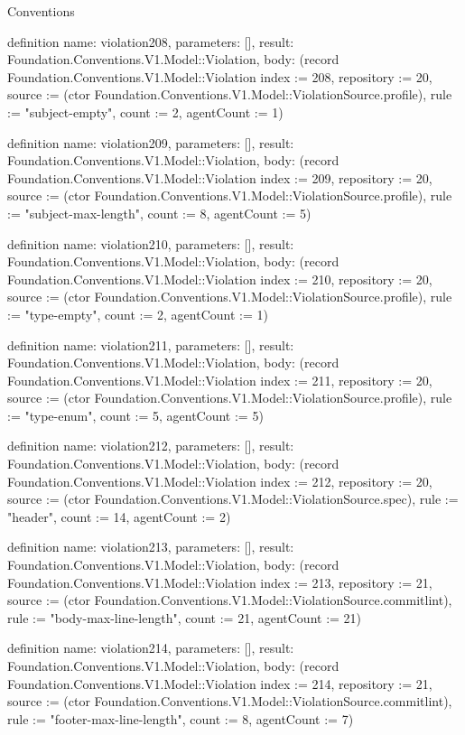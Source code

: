 \begin{lexlean}{Conventions}
\begin{semanticmodule}
definition{
  name: violation208,
  parameters: [],
  result: Foundation.Conventions.V1.Model::Violation,
  body: (record Foundation.Conventions.V1.Model::Violation {index := 208, repository := 20, source := (ctor Foundation.Conventions.V1.Model::ViolationSource.profile), rule := "subject-empty", count := 2, agentCount := 1})
}

definition{
  name: violation209,
  parameters: [],
  result: Foundation.Conventions.V1.Model::Violation,
  body: (record Foundation.Conventions.V1.Model::Violation {index := 209, repository := 20, source := (ctor Foundation.Conventions.V1.Model::ViolationSource.profile), rule := "subject-max-length", count := 8, agentCount := 5})
}

definition{
  name: violation210,
  parameters: [],
  result: Foundation.Conventions.V1.Model::Violation,
  body: (record Foundation.Conventions.V1.Model::Violation {index := 210, repository := 20, source := (ctor Foundation.Conventions.V1.Model::ViolationSource.profile), rule := "type-empty", count := 2, agentCount := 1})
}

definition{
  name: violation211,
  parameters: [],
  result: Foundation.Conventions.V1.Model::Violation,
  body: (record Foundation.Conventions.V1.Model::Violation {index := 211, repository := 20, source := (ctor Foundation.Conventions.V1.Model::ViolationSource.profile), rule := "type-enum", count := 5, agentCount := 5})
}

definition{
  name: violation212,
  parameters: [],
  result: Foundation.Conventions.V1.Model::Violation,
  body: (record Foundation.Conventions.V1.Model::Violation {index := 212, repository := 20, source := (ctor Foundation.Conventions.V1.Model::ViolationSource.spec), rule := "header", count := 14, agentCount := 2})
}

definition{
  name: violation213,
  parameters: [],
  result: Foundation.Conventions.V1.Model::Violation,
  body: (record Foundation.Conventions.V1.Model::Violation {index := 213, repository := 21, source := (ctor Foundation.Conventions.V1.Model::ViolationSource.commitlint), rule := "body-max-line-length", count := 21, agentCount := 21})
}

definition{
  name: violation214,
  parameters: [],
  result: Foundation.Conventions.V1.Model::Violation,
  body: (record Foundation.Conventions.V1.Model::Violation {index := 214, repository := 21, source := (ctor Foundation.Conventions.V1.Model::ViolationSource.commitlint), rule := "footer-max-line-length", count := 8, agentCount := 7})
}


\end{semanticmodule}
\end{lexlean}
